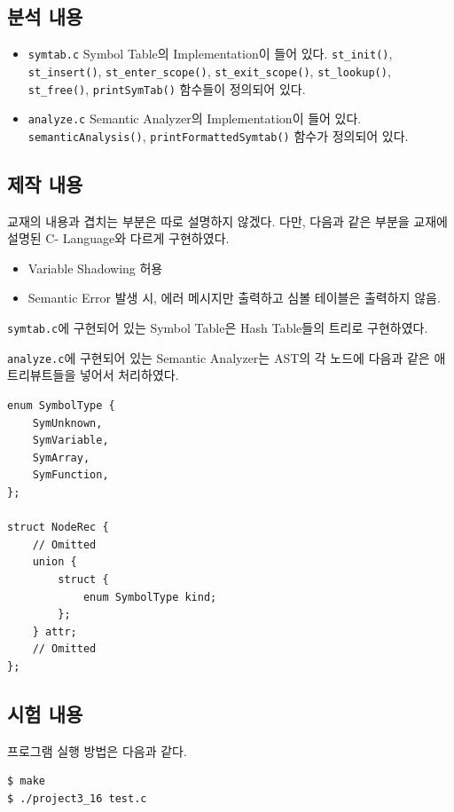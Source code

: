 \documentclass[a4paper, 10pt]{oblivoir}
\begin{document}
\subsection{분석 내용}
\begin{itemize}
\item \texttt{symtab.c} \newline
 Symbol Table의 Implementation이 들어 있다. \texttt{st\_init()}, \texttt{st\_insert()}, \texttt{st\_enter\_scope()}, \texttt{st\_exit\_scope()}, \texttt{st\_lookup()}, \texttt{st\_free()}, \texttt{printSymTab()} 함수들이 정의되어 있다.
\item \texttt{analyze.c} \newline
 Semantic Analyzer의 Implementation이 들어 있다. \texttt{semanticAnalysis()}, \texttt{printFormattedSymtab()} 함수가 정의되어 있다.
\end{itemize}

\subsection{제작 내용}
교재의 내용과 겹치는 부분은 따로 설명하지 않겠다.
다만, 다음과 같은 부분을 교재에 설명된 C- Language와 다르게 구현하였다.

\begin{itemize}
	\item Variable Shadowing 허용
	\item Semantic Error 발생 시, 에러 메시지만 출력하고 심볼 테이블은 출력하지 않음.
\end{itemize}

\texttt{symtab.c}에 구현되어 있는 Symbol Table은 Hash Table들의 트리로 구현하였다.

\texttt{analyze.c}에 구현되어 있는 Semantic Analyzer는 AST의 각 노드에 다음과 같은 애트리뷰트들을 넣어서 처리하였다.

\begin{lstlisting}[frame=single]
enum SymbolType {
    SymUnknown,
    SymVariable,
    SymArray,
    SymFunction,
};

struct NodeRec {
    // Omitted
    union {
        struct {
            enum SymbolType kind;
        };
    } attr;
    // Omitted
};
\end{lstlisting}

\subsection{시험 내용}
프로그램 실행 방법은 다음과 같다.
\begin{lstlisting}[frame=single]
$ make
$ ./project3_16 test.c
\end{lstlisting}
\end{document}
